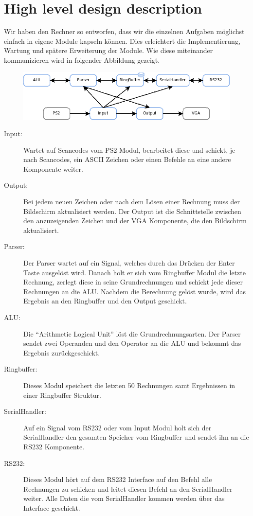 \section{High level design description}
Wir haben den Rechner so entworfen, dass wir die einzelnen Aufgaben möglichst einfach in eigene Module
kapseln können. Dies erleichtert die Implementierung, Wartung und spätere Erweiterung der Module.
Wie diese miteinander kommunizieren wird in folgender Abbildung gezeigt.

\begin{figure}[!ht]
 \includegraphics[scale=0.55]{pics/Modules.png}
 \label{fig:Modules}
\end{figure}

\begin{description}
 \item[Input:] Wartet auf Scancodes vom PS2 Modul, bearbeitet diese und schickt, je nach Scancodes, 
ein ASCII Zeichen oder einen Befehle an eine andere Komponente weiter.
 \item[Output:] Bei jedem neuen Zeichen oder nach dem Lösen einer Rechnung muss der Bildschirm aktualisiert werden.
Der Output ist die Schnittstelle zwischen den anzuzeigenden Zeichen und der VGA Komponente, die den Bildschirm 
aktualisiert.
 \item[Parser:] Der Parser wartet auf ein Signal, welches durch das Drücken der Enter Taste ausgelöst wird. Danach holt er sich vom
Ringbuffer Modul die letzte Rechnung, zerlegt diese in seine Grundrechnungen und schickt jede dieser Rechnungen an die ALU.
Nachdem die Berechnung gelöst wurde, wird das Ergebnis an den Ringbuffer und den Output geschickt.
 \item[ALU:] Die ``Arithmetic Logical Unit'' löst die Grundrechnungsarten. Der Parser sendet zwei Operanden und den Operator an die ALU 
und bekommt das Ergebnis zurückgeschickt. 
 \item[Ringbuffer:] Dieses Modul speichert die letzten 50 Rechnungen samt Ergebnissen in einer Ringbuffer Struktur. 
 \item[SerialHandler:] Auf ein Signal vom RS232 oder vom Input Modul holt sich der SerialHandler den gesamten Speicher vom Ringbuffer 
und sendet ihn an die RS232 Komponente.
 \item[RS232:] Dieses Modul hört auf dem RS232 Interface auf den Befehl alle Rechnungen zu schicken und leitet diesen Befehl an den
SerialHandler weiter. Alle Daten die vom SerialHandler kommen werden über das Interface geschickt.
 \end{description}

